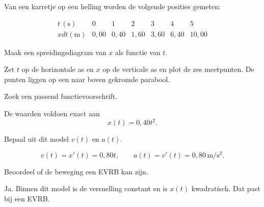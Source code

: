\documentclass{ximera}
\begin{document}
\begin{oefening}{\oefU\ESS}

Van een karretje op een helling worden de volgende posities gemeten:

\[\begin{array}{c|cccccc} t\,(\mathrm{s}) & 0&1&2&3&4&5\\ \hline xdt(\mathrm{m}) & 0,00&0,40&1,60&3,60&6,40&10,00 \end{array}\]

\begin{question}

Maak een spreidingsdiagram van $x$ als functie van $t$.

\begin{oplossing}
Zet \(t\) op de horizontale as en \(x\) op de verticale as en plot de zes meetpunten. De punten liggen op een naar boven gekromde parabool.
\end{oplossing}

\end{question}

\begin{question}

Zoek een passend functievoorschrift.

\begin{oplossing}
De waarden voldoen exact aan
\[x(t)=0,40t^2.\]
\end{oplossing}

\end{question}

\begin{question}

Bepaal uit dit model $v(t)$ en $a(t)$.

\begin{oplossing}
\[v(t)=x'(t)=0,80t, \qquad a(t)=v'(t)=0,80\,\mathrm{m/s^2}.\]
\end{oplossing}

\end{question}

\begin{question}

Beoordeel of de beweging een EVRB kan zijn.

\begin{oplossing}
Ja. Binnen dit model is de versnelling constant en is \(x(t)\) kwadratisch. Dat past bij een EVRB.
\end{oplossing}

\end{question}


\end{oefening}
\end{document}
